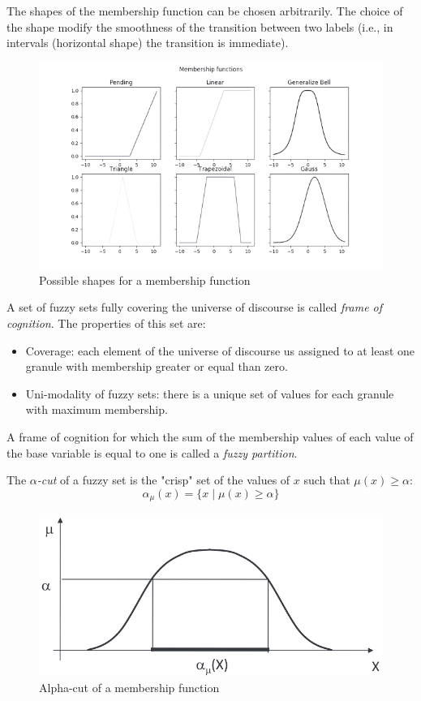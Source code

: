 \documentclass[12pt, a4paper]{report}
\begin{document}
    The shapes of the membership function can be chosen arbitrarily. The choice of the shape modify the smoothness of the transition 
    between two labels (i.e., in intervals (horizontal shape) the transition is immediate). 
    \begin{figure}[H]
        \centering
        \includegraphics[width=0.75\linewidth]{images/shape.png}
        \caption{Possible shapes for a membership function}
    \end{figure}
    \begin{definition}
        A set of fuzzy sets fully covering the universe of discourse is called \emph{frame of cognition}. The properties of this set are:
        \begin{itemize}
            \item Coverage: each element of the universe of discourse us assigned to at least one granule with membership greater or equal 
                than zero.
            \item Uni-modality of fuzzy sets: there is a unique set of values for each granule with maximum membership. 
        \end{itemize}
    \end{definition}
    \begin{definition}
        A frame of cognition for which the sum  of the membership values of each value of the base variable is equal to one is called 
        a \emph{fuzzy partition}. 
    \end{definition}
    \begin{definition}
        The \emph{$\alpha$-cut} of a fuzzy set is the "crisp" set of the values of $x$ such that $\mu(x) \geq \alpha$:
        \[\alpha_\mu(x)=\{x \mid \mu(x) \geq \alpha\}\]
    \end{definition}
    \begin{figure}[H]
        \centering
        \includegraphics[width=0.5\linewidth]{images/alpha.png}
        \caption{Alpha-cut of a membership function}
    \end{figure}
\end{document}
